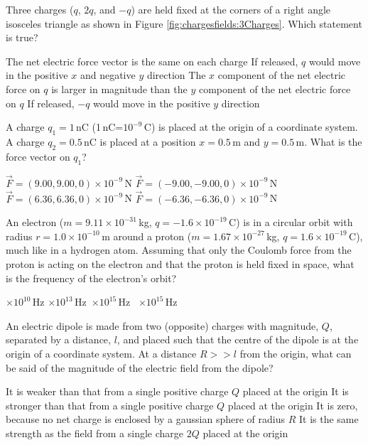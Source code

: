 \question Three charges ($q$, $2q$, and $-q$) are held fixed at the corners of a right angle isosceles triangle as shown in Figure \ref{fig:chargesfields:3Charges}. Which statement is true?
\begin{choices} 
\choice The net electric force vector is the same on each charge
\choice If released, $q$ would move in the positive $x$ and negative $y$ direction
\CorrectChoice The $x$ component of the net electric force on $q$ is larger in magnitude than the $y$ component of the net electric force on $q$ \correct
\choice If released, $-q$ would move in the positive $y$ direction
\end{choices}

\question A charge $q_1=1$\,nC (1\,nC=$10^{-9}$\,C) is placed at the origin of a coordinate system. A charge $q_2=0.5$\,nC is placed at a position $x=0.5$\,m and $y=0.5$\,m. What is the force vector on $q_1$?
\begin{checkboxes}
\choice $\vec F = (9.00, 9.00, 0)\times10^{-9}$\,N 
\choice $\vec F = (-9.00, -9.00, 0)\times10^{-9}$\,N 
\choice $\vec F = (6.36, 6.36, 0)\times10^{-9}$\,N 
\CorrectChoice $\vec F = (-6.36, -6.36, 0)\times10^{-9}$\,N \correct
\end{checkboxes}

\question An electron ($m=9.11\times 10^{-31}$\,kg, $q=-1.6\times 10^{-19}$\,C) is in a circular orbit with radius $r=1.0\times 10^{-10}$\,m around a proton ($m=1.67\times 10^{-27}$\,kg, $q=1.6\times 10^{-19}$\,C), much like in a hydrogen atom. Assuming that only the Coulomb force from the proton is acting on the electron and that the proton is held fixed in space, what is the frequency of the electron's orbit?
\begin{checkboxes}
$\times 10^{10}$\,Hz 
$\times 10^{13}$\,Hz\
$\times 10^{15}$\,Hz\ \correct
{}$\times 10^{15}$\,Hz
\end{checkboxes}

\question An electric dipole is made from two (opposite) charges with magnitude, $Q$, separated by a distance, $l$, and placed such that the centre of the dipole is at the origin of a coordinate system. At a distance $R >> l$ from the origin, what can be said of the magnitude of the electric field from the dipole?
\begin{checkboxes}
\CorrectChoice It is weaker than that from a single positive charge $Q$ placed at the origin \correct
\choice It is stronger than that from a single positive charge $Q$ placed at the origin
\choice It is zero, because no net charge is enclosed by a gaussian sphere of radius $R$
\choice It is the same strength as the field from a single charge $2Q$ placed at the origin
\end{checkboxes}

